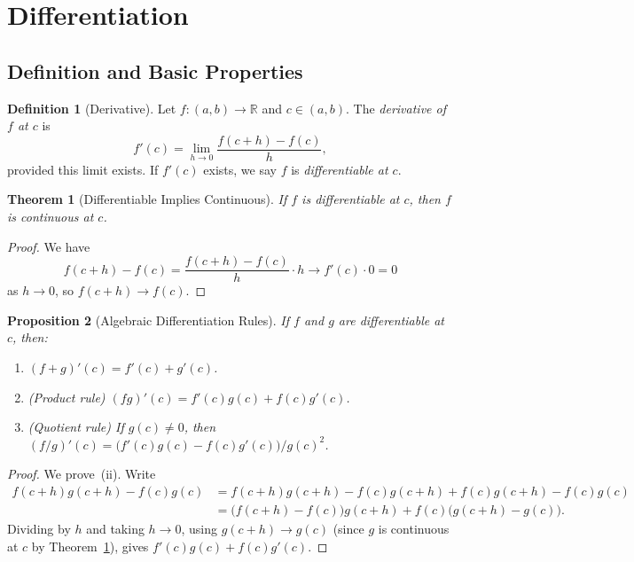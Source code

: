 \documentclass[11pt,a4paper]{article}
\theoremstyle{definition}
\newtheorem{definition}{Definition}[section]
\theoremstyle{plain}
\newtheorem{theorem}{Theorem}[section]
\newtheorem{proposition}[theorem]{Proposition}
\theoremstyle{remark}
\newcommand{\R}{\mathbb{R}}
\begin{document}
\section{Differentiation}
\label{sec:differentiation}

\subsection{Definition and Basic Properties}
\label{subsec:diff_def}

\begin{definition}[Derivative]
\label{def:derivative}
Let $f : (a, b) \to \R$ and $c \in (a, b)$. The \emph{derivative of $f$ at $c$}
is
\[
f'(c) = \lim_{h \to 0} \frac{f(c + h) - f(c)}{h},
\]
provided this limit exists. If $f'(c)$ exists, we say $f$ is \emph{differentiable
at $c$}.
\end{definition}

\begin{theorem}[Differentiable Implies Continuous]
\label{thm:diff_cont}
If $f$ is differentiable at $c$, then $f$ is continuous at $c$.
\end{theorem}

\begin{proof}
We have
\[
f(c + h) - f(c) = \frac{f(c+h) - f(c)}{h} \cdot h \to f'(c) \cdot 0 = 0
\]
as $h \to 0$, so $f(c+h) \to f(c)$.
\end{proof}

\begin{proposition}[Algebraic Differentiation Rules]
\label{prop:diff_rules}
If $f$ and $g$ are differentiable at $c$, then:
\begin{enumerate}[nosep,label=(\roman*)]
    \item $(f + g)'(c) = f'(c) + g'(c)$.
    \item (Product rule) $(fg)'(c) = f'(c)g(c) + f(c)g'(c)$.
    \item (Quotient rule) If $g(c) \neq 0$, then
    $(f/g)'(c) = \bigl(f'(c)g(c) - f(c)g'(c)\bigr)/g(c)^2$.
\end{enumerate}
\end{proposition}

\begin{proof}
We prove~(ii). Write
\begin{align*}
f(c+h)g(c+h) - f(c)g(c)
&= f(c+h)g(c+h) - f(c)g(c+h) + f(c)g(c+h) - f(c)g(c) \\
&= \bigl(f(c+h) - f(c)\bigr)g(c+h) + f(c)\bigl(g(c+h) - g(c)\bigr).
\end{align*}
Dividing by $h$ and taking $h \to 0$, using $g(c+h) \to g(c)$ (since $g$ is
continuous at $c$ by Theorem~\ref{thm:diff_cont}), gives
$f'(c)g(c) + f(c)g'(c)$.
\end{proof}
\end{document}
